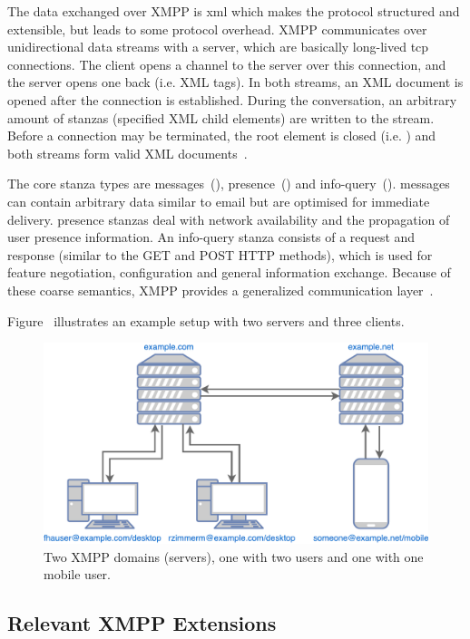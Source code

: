 The data exchanged over XMPP is \gls{xml} which makes the protocol structured and extensible, but leads to some protocol overhead.
XMPP communicates over unidirectional data streams with a server, which are basically long-lived \gls{tcp} connections.
The client opens a channel to the server over this connection, and the server opens one back (i.e.  XML tags). In both streams, an XML document is opened after the connection is established.
During the conversation, an arbitrary amount of \glspl{stanza} (specified XML child elements) are written to the stream.
Before a connection may be terminated, the root element is closed (i.e. ) and both streams form valid XML documents~\cite{rfc6120}\cite{professional-xmpp}.

The core \gls{stanza} types are \glspl{message}~(), \gls{presence}~() and \gls{info-query}~().
\Glspl{message} can contain arbitrary data similar to email but are optimised for immediate delivery.
\Gls{presence} \glspl{stanza} deal with network availability and the propagation of user presence information.
An \gls{info-query} \gls{stanza} consists of a request and response (similar to the GET and POST HTTP methods), which is used for feature negotiation, configuration and general information exchange.
Because of these coarse semantics, XMPP provides a generalized communication layer~\cite{rfc6120}\cite{ieee-xplore-stream-xml-xmpp}.

Figure~ illustrates an example setup with two servers and three clients.

\begin{figure}[h]
	\centering
	\includegraphics[width=0.8\linewidth]{resources/xmpp_overview.pdf}
	\caption{Two XMPP domains (servers), one with two users and one with one mobile user.}
	\label{fig:xmpp-overview}
\end{figure}

\subsection{Relevant XMPP Extensions}

